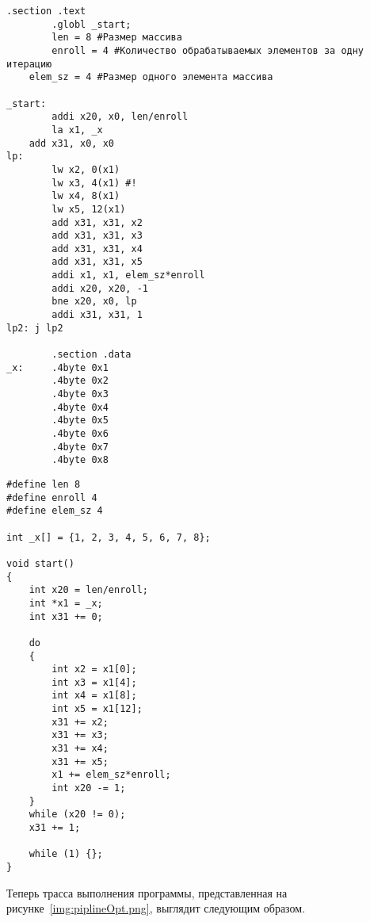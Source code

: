 \begin{lstlisting}[caption={Код оптимизированной программы по индивидуальному варианту}, label=lst3, style=Go]
        .section .text
        .globl _start;
        len = 8 #Размер массива
        enroll = 4 #Количество обрабатываемых элементов за одну итерацию
	elem_sz = 4 #Размер одного элемента массива

_start:
        addi x20, x0, len/enroll
        la x1, _x
	add x31, x0, x0
lp:
        lw x2, 0(x1)
        lw x3, 4(x1) #!
        lw x4, 8(x1)
        lw x5, 12(x1)
        add x31, x31, x2
        add x31, x31, x3
        add x31, x31, x4
        add x31, x31, x5
        addi x1, x1, elem_sz*enroll
        addi x20, x20, -1
        bne x20, x0, lp
        addi x31, x31, 1
lp2: j lp2

        .section .data
_x:     .4byte 0x1
        .4byte 0x2
        .4byte 0x3
        .4byte 0x4
        .4byte 0x5
        .4byte 0x6
        .4byte 0x7
        .4byte 0x8
\end{lstlisting}



\begin{lstlisting}[caption={Псевдокод оптимизировнной программы на языке Си}, label=lst4, style=Go]
#define len 8
#define enroll 4
#define elem_sz 4

int _x[] = {1, 2, 3, 4, 5, 6, 7, 8};

void start()
{
	int x20 = len/enroll;
	int *x1 = _x;
	int x31 += 0;
	
	do
	{
		int x2 = x1[0];
		int x3 = x1[4];
		int x4 = x1[8];
		int x5 = x1[12];
		x31 += x2;
		x31 += x3;
		x31 += x4;
		x31 += x5;
		x1 += elem_sz*enroll;
		int x20 -= 1;
	}
	while (x20 != 0);
	x31 += 1;
	
	while (1) {};
}
\end{lstlisting}

Теперь трасса выполнения программы, представленная на рисунке~\ref{img:piplineOpt.png}, выглядит следующим образом.

\newpage